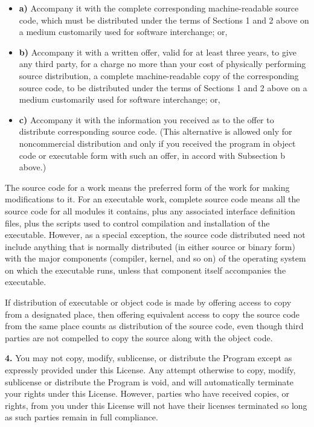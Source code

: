 {\begin{itemize}
\item {\bf a)} Accompany it with the complete corresponding  machine-readable
   source code, which must be distributed under the terms of  Sections 1 and 2
   above on a medium customarily used for software interchange;  or,  

\item {\bf b)} Accompany it with a written offer, valid for at least  three
   years, to give any third party, for a charge no more than your cost of 
   physically performing source distribution, a complete machine-readable copy of
the corresponding source code, to be distributed under the terms of Sections
1  and 2 above on a medium customarily used for software interchange; or,  

\item {\bf c)} Accompany it with the information you received as to  the offer
   to distribute corresponding source code. (This alternative is  allowed only
   for noncommercial distribution and only if you received the  program in object
code or executable form with such an offer, in accord with  Subsection b
above.) 
\end{itemize}

The source code for a work means the preferred form of the work for making
modifications to it. For an executable work, complete source code means all
the source code for all modules it contains, plus any associated interface
definition files, plus the scripts used to control compilation and
installation of the executable. However, as a special exception, the source
code distributed need not include anything that is normally distributed (in
either source or binary form) with the major components (compiler, kernel, and
so on) of the operating system on which the executable runs, unless that
component itself accompanies the executable. 

If distribution of executable or object code is made by offering access to
copy from a designated place, then offering equivalent access to copy the
source code from the same place counts as distribution of the source code,
even though third parties are not compelled to copy the source along with the
object code. 

{\bf 4.} You may not copy, modify, sublicense, or distribute the Program
except as expressly provided under this License. Any attempt otherwise to
copy, modify, sublicense or distribute the Program is void, and will
automatically terminate your rights under this License. However, parties who
have received copies, or rights, from you under this License will not have
their licenses terminated so long as such parties remain in full compliance. 

}
